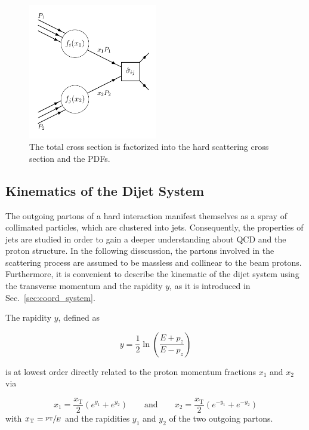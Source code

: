 \begin{figure}[htbp]
    \centering
    \includegraphics[width=0.5\textwidth]{figures/drawings/hardscattering.pdf}
    \caption[Factorization of hard scattering cross section.]
        {The total cross section is factorized into the hard scattering cross
        section and the PDFs.}
    \label{fig:crosssection_factorization}
\end{figure}

\subsection{Kinematics of the Dijet System}

The outgoing partons of a hard interaction manifest themselves as a spray of
collimated particles, which are clustered into jets. Consequently, the
properties of jets are studied in order to gain a deeper understanding about
QCD and the proton structure. In the following disscussion, the partons
involved in the scattering process are assumed to be massless and collinear to
the beam protons. Furthermore, it is convenient to describe the kinematic of
the dijet system using the transverse momentum \pt and the rapidity $y$, as it
is introduced in Sec.~\ref{sec:coord_system}. 

The rapidity $y$, defined as

\begin{equation*}
    y = \frac{1}{2} \ln \left( \frac{E+p_z}{E-p_z} \right) 
\end{equation*}

is at lowest order directly related to the proton momentum fractions $x_1$ and
$x_2$ via

\begin{equation*}
    x_1 = \frac{x_\mathrm{T}}{2} \left( e^{y_1} + e^{y_2} \right)
    \qquad\text{and}\qquad x_2 = \frac{x_\mathrm{T}}{2} \left( e^{-y_1} +
    e^{-y_2} \right)
\end{equation*}
with $x_{\mathrm{T}} = \sfrac{p_{\mathrm{T}}}{E}$ and the rapidities $y_1$ and $y_2$ of the
two outgoing partons.



